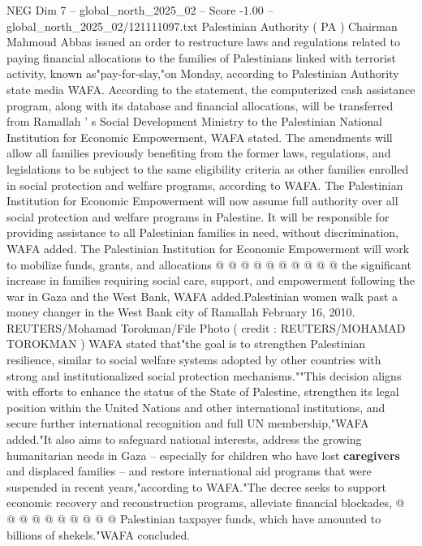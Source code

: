\begin{textsample}{NEG Dim 7 – global\_north\_2025\_02 – Score -1.00 – global\_north\_2025\_02/121111097.txt}  \label{ex:f7_neg_171}
Palestinian Authority ( PA ) Chairman Mahmoud Abbas issued an order to restructure laws and regulations related to paying financial allocations to the families of Palestinians linked with terrorist activity, known as"pay-for-slay,"on Monday, according to Palestinian Authority state media WAFA.
According to the statement, the computerized cash assistance program, along with its database and financial allocations, will be transferred from Ramallah ' s Social Development Ministry to the Palestinian National Institution for Economic Empowerment, WAFA stated.
The amendments will allow all families previously benefiting from the former laws, regulations, and legislations to be subject to the same eligibility criteria as other families enrolled in social protection and welfare programs, according to WAFA.
The Palestinian Institution for Economic Empowerment will now assume full authority over all social protection and welfare programs in Palestine.
It will be responsible for providing assistance to all Palestinian families in need, without discrimination, WAFA added.
The Palestinian Institution for Economic Empowerment will work to mobilize funds, grants, and allocations @ @ @ @ @ @ @ @ @ @ the significant increase in families requiring social care, support, and empowerment following the war in Gaza and the West Bank, WAFA added.Palestinian women walk past a money changer in the West Bank city of Ramallah February 16, 2010.
REUTERS/Mohamad Torokman/File Photo ( credit : REUTERS/MOHAMAD TOROKMAN ) WAFA stated that"the goal is to strengthen Palestinian resilience, similar to social welfare systems adopted by other countries with strong and institutionalized social protection mechanisms.""This decision aligns with efforts to enhance the status of the State of Palestine, strengthen its legal position within the United Nations and other international institutions, and secure further international recognition and full UN membership,"WAFA added."It also aims to safeguard national interests, address the growing humanitarian needs in Gaza -- especially for children who have lost \textbf{caregivers} and displaced families -- and restore international aid programs that were suspended in recent years,"according to WAFA."The decree seeks to support economic recovery and reconstruction programs, alleviate financial blockades, @ @ @ @ @ @ @ @ @ @ Palestinian taxpayer funds, which have amounted to billions of shekels."WAFA concluded.

\end{textsample}
